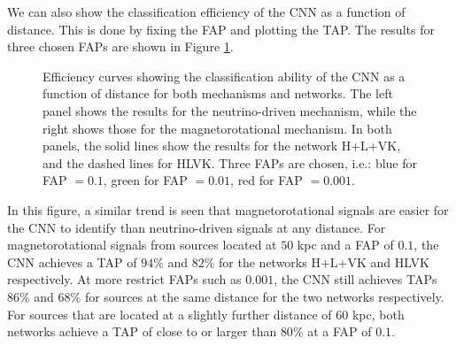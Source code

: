 \documentclass[aps,twocolumn,showpacs,groupedaddress, nofootinbib]{revtex4}  %
\begin{document}
We can also show the classification efficiency of the \ac{CNN}  as a function of distance.
This is done by fixing the \ac{FAP} and plotting the \ac{TAP}. 
The results for three chosen \acp{FAP} are shown in Figure \ref{fig:eff}.
\begin{figure}
     \begin{center}
%
        \quad
%
    \end{center}
    \caption{Efficiency curves showing the classification ability of the \ac{CNN} as a function of distance for both mechanisms and networks.
The left panel shows the results for the neutrino-driven mechanism, while the right shows those for the magnetorotational mechanism. 
In both panels, the solid lines show the results for the network H+L+VK, and the dashed lines for HLVK.
Three \acp{FAP} are chosen, i.e.: blue for \ac{FAP} $=0.1$, green for \ac{FAP} $=0.01$, red for \ac{FAP} $=0.001$.
\label{fig:eff}}%
\end{figure}
In this figure, a similar trend is seen that magnetorotational signals are easier for the \ac{CNN} to identify than neutrino-driven signals at any distance. 
For magnetorotational signals from sources located at $50$ kpc and a \ac{FAP} of $0.1$, 
the \ac{CNN} achieves a \ac{TAP} of $94\%$ and $82\%$ for the networks H+L+VK and HLVK respectively.
At more restrict \acp{FAP} such as $0.001$, the \ac{CNN} still achieves \acp{TAP} $86\%$ and $68\%$ for sources at the same distance for the two networks respectively.
For sources that are located at a slightly further distance of $60$ kpc, both networks achieve a \ac{TAP} of close to or larger than $80\%$ at a \ac{FAP} of $0.1$.  
\end{document}
